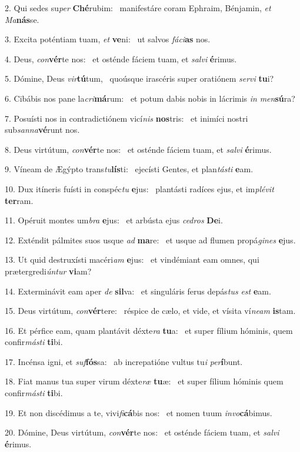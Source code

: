 2. Qui sedes su\textit{per} \textbf{Ché}rubim: \ast\  manifestáre coram Ephraim, Bénjamin, \textit{et} \textit{Ma}\textbf{nás}se.\

3. Excita poténtiam tuam, \textit{et} \textbf{ve}ni: \ast\  ut salvos \textit{fá}\textit{ci}\textbf{as} nos.\

4. Deus, \textit{con}\textbf{vér}te nos: \ast\  et osténde fáciem tuam, et \textit{sal}\textit{vi} \textbf{é}rimus.\

5. Dómine, Deus \textit{vir}\textbf{tú}tum, \ast\  quoúsque irascéris super oratiónem \textit{ser}\textit{vi} \textbf{tu}i?\

6. Cibábis nos pane la\textit{cri}\textbf{má}rum: \ast\  et potum dabis nobis in lácrimis \textit{in} \textit{men}\textbf{sú}ra?\

7. Posuísti nos in contradictiónem vicí\textit{nis} \textbf{nos}tris: \ast\  et inimíci nostri sub\textit{san}\textit{na}\textbf{vé}runt nos.\

8. Deus virtútum, \textit{con}\textbf{vér}te nos: \ast\  et osténde fáciem tuam, et \textit{sal}\textit{vi} \textbf{é}rimus.\

9. Víneam de Ægýpto trans\textit{tu}\textbf{lís}ti: \ast\  ejecísti Gentes, et plan\textit{tás}\textit{ti} \textbf{e}am.\

10. Dux itíneris fuísti in conspéc\textit{tu} \textbf{e}jus: \ast\  plantásti radíces ejus, et im\textit{plé}\textit{vit} \textbf{ter}ram.\

11. Opéruit montes um\textit{bra} \textbf{e}jus: \ast\  et arbústa ejus \textit{ce}\textit{dros} \textbf{De}i.\

12. Exténdit pálmites suos usque \textit{ad} \textbf{ma}re: \ast\  et usque ad flumen propá\textit{gi}\textit{nes} \textbf{e}jus.\

13. Ut quid destruxísti macéri\textit{am} \textbf{e}jus: \ast\  et vindémiant eam omnes, qui prætergredi\textit{ún}\textit{tur} \textbf{vi}am?\

14. Exterminávit eam aper \textit{de} \textbf{sil}va: \ast\  et singuláris ferus depás\textit{tus} \textit{est} \textbf{e}am.\

15. Deus virtútum, \textit{con}\textbf{vér}tere: \ast\  réspice de cælo, et vide, et vísita ví\textit{ne}\textit{am} \textbf{is}tam.\

16. Et pérfice eam, quam plantávit déxte\textit{ra} \textbf{tu}a: \ast\  et super fílium hóminis, quem confir\textit{más}\textit{ti} \textbf{ti}bi.\

17. Incénsa igni, et \textit{suf}\textbf{fós}sa: \ast\  ab increpatióne vultus tu\textit{i} \textit{per}\textbf{í}bunt.\

18. Fiat manus tua super virum déxte\textit{ræ} \textbf{tu}æ: \ast\  et super fílium hóminis quem confir\textit{más}\textit{ti} \textbf{ti}bi.\

19. Et non discédimus a te, vivi\textit{fi}\textbf{cá}bis nos: \ast\  et nomen tuum \textit{in}\textit{vo}\textbf{cá}bimus.\

20. Dómine, Deus virtútum, \textit{con}\textbf{vér}te nos: \ast\  et osténde fáciem tuam, et \textit{sal}\textit{vi} \textbf{é}rimus.\

